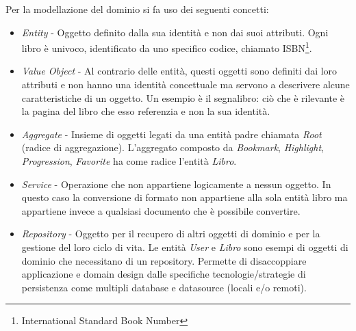 Per la modellazione del dominio si fa uso dei seguenti concetti\cite{evans_domain-driven_2004}:
\begin{itemize}
    \item \textit{Entity} - Oggetto definito dalla sua identità e non dai suoi attributi. Ogni libro è univoco, identificato da uno specifico codice, chiamato ISBN\footnote{International Standard Book Number}.
    \item \textit{Value Object} - Al contrario delle entità, questi oggetti sono definiti dai loro attributi e non hanno una identità concettuale ma servono a descrivere alcune caratteristiche di un oggetto. Un esempio è il segnalibro: ciò che è rilevante è la pagina del libro che esso referenzia e non la sua identità.
    \item \textit{Aggregate} - Insieme di oggetti legati da una entità padre chiamata \textit{Root} (radice di aggregazione). L'aggregato composto da \textit{Bookmark}, \textit{Highlight}, \textit{Progression}, \textit{Favorite} ha come radice l'entità \textit{Libro}.
    \item \textit{Service} - Operazione che non appartiene logicamente a nessun oggetto. In questo caso la conversione di formato non appartiene alla sola entità libro ma appartiene invece a qualsiasi documento che è possibile convertire.
    \item \textit{Repository} - Oggetto per il recupero di altri oggetti di dominio e per la gestione del loro ciclo di vita. Le entità \textit{User} e \textit{Libro} sono esempi di oggetti di dominio che necessitano di un repository. Permette di disaccoppiare applicazione e domain design dalle specifiche tecnologie/strategie di persistenza come multipli database e datasource (locali e/o remoti).
\end{itemize}


